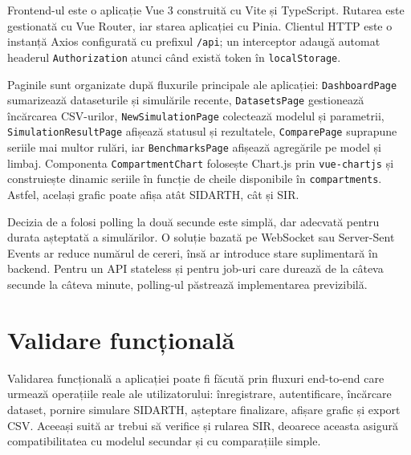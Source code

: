 Frontend-ul este o aplicație Vue 3 construită cu Vite și TypeScript. Rutarea este
gestionată cu Vue Router, iar starea aplicației cu Pinia. Clientul HTTP este o
instanță Axios configurată cu prefixul \texttt{/api}; un interceptor adaugă automat
headerul \texttt{Authorization} atunci când există token în \texttt{localStorage}.

Paginile sunt organizate după fluxurile principale ale aplicației:
\texttt{DashboardPage} sumarizează dataseturile și simulările recente,
\texttt{DatasetsPage} gestionează încărcarea CSV-urilor,
\texttt{NewSimulationPage} colectează modelul și parametrii,
\texttt{SimulationResultPage} afișează statusul și rezultatele,
\texttt{ComparePage} suprapune seriile mai multor rulări, iar
\texttt{BenchmarksPage} afișează agregările pe model și limbaj. Componenta
\texttt{CompartmentChart} folosește Chart.js prin \texttt{vue-chartjs} și
construiește dinamic seriile în funcție de cheile disponibile în
\texttt{compartments}. Astfel, același grafic poate afișa atât SIDARTH, cât și SIR.

Decizia de a folosi polling la două secunde este simplă, dar adecvată pentru
durata așteptată a simulărilor. O soluție bazată pe WebSocket sau Server-Sent
Events ar reduce numărul de cereri, însă ar introduce stare suplimentară în
backend. Pentru un API stateless și pentru job-uri care durează de la câteva
secunde la câteva minute, polling-ul păstrează implementarea previzibilă.

\section{Validare funcțională}
\label{sec:testare_functionala}

Validarea funcțională a aplicației poate fi făcută prin fluxuri end-to-end care
urmează operațiile reale ale utilizatorului: înregistrare, autentificare, încărcare
dataset, pornire simulare SIDARTH, așteptare finalizare, afișare grafic și export
CSV. Aceeași suită ar trebui să verifice și rularea SIR, deoarece aceasta asigură
compatibilitatea cu modelul secundar și cu comparațiile simple.
